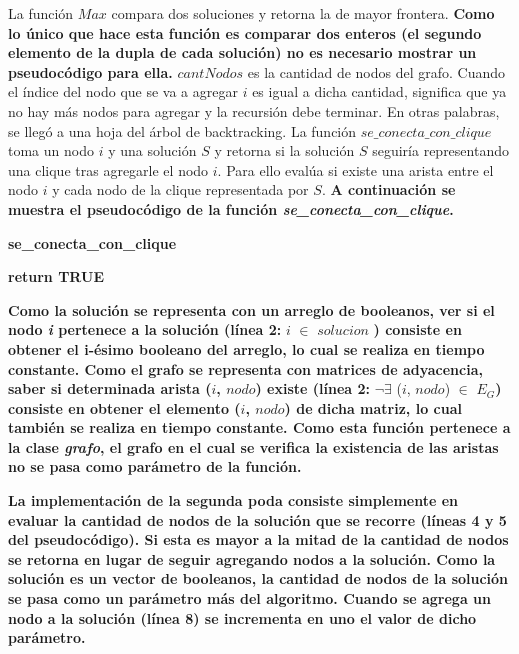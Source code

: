 \par{{\color{dGray}La función $Max$ compara dos soluciones y retorna la de mayor
frontera.} \textbf{Como lo único que hace esta función es comparar dos enteros
(el segundo elemento de la dupla de cada solución) no es necesario mostrar un
pseudocódigo para ella.}
{\color{dGray} $cantNodos$ es la cantidad de nodos del grafo. Cuando el índice
del nodo que se va a agregar $i$ es igual a dicha cantidad, significa que ya no
hay más nodos para agregar y la recursión debe terminar. En otras palabras, se
llegó a una hoja del árbol de backtracking.
La función $se\_conecta\_con\_clique$ toma un
nodo $i$ y una solución $S$ y retorna si la solución $S$ seguiría representando
una clique tras agregarle el nodo $i$. Para ello evalúa si existe una arista
entre el nodo $i$ y cada nodo de la clique representada por $S$.} \textbf{A
continuación se muestra el pseudocódigo de la función
\textit{se\_conecta\_con\_clique}.}}

\begin{algorithm}[H]
	\caption{\textbf{se\_conecta\_con\_clique}}
	\textbf{return TRUE}
\end{algorithm}

\par{\textbf{Como la solución se representa con un arreglo de booleanos, ver si
el nodo \textit{i} pertenece a la solución (línea 2: }$i$ $\in$ $solucion$
\textbf{) consiste en obtener el i-ésimo booleano del arreglo, lo cual se
realiza en tiempo constante. Como el grafo se representa con matrices de
adyacencia, saber si determinada arista ($i$, $nodo$) existe (línea 2: }$\neg
\exists$ ($i$, $nodo$) $\in$ $E_G$\textbf{) consiste en obtener el elemento
($i$, $nodo$) de dicha matriz, lo cual también se realiza en tiempo constante.
Como esta función pertenece a la clase \textit{grafo}, el grafo en el cual se
verifica la existencia de las aristas no se pasa como parámetro de la
función.}}\\

\par{\textbf{La implementación de la segunda poda consiste simplemente en
evaluar la cantidad de nodos de la solución que se recorre (líneas 4 y 5 del
pseudocódigo). Si esta es mayor a la mitad de la cantidad de nodos se retorna
en lugar de seguir agregando nodos a la solución. Como la solución es un vector
de booleanos, la cantidad de nodos de la solución se pasa como un parámetro más
del algoritmo. Cuando se agrega un nodo a la solución (línea 8) se incrementa
en uno el valor de dicho parámetro.}}

